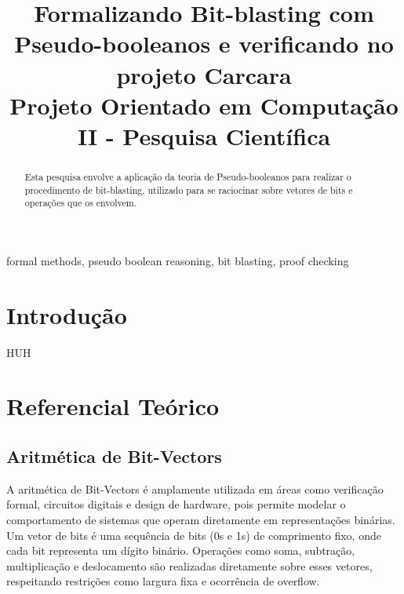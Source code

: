\documentclass[conference]{IEEEtran}
\begin{document}
\title{Formalizando Bit-blasting com Pseudo-booleanos e verificando no projeto Carcara\\
{\footnotesize Projeto Orientado em Computação II - Pesquisa Científica}
}

\author{
}

\maketitle

\begin{abstract}
    Esta pesquisa envolve a aplicação da teoria de Pseudo-booleanos para realizar o procedimento de
    bit-blasting, utilizado para se raciocinar sobre vetores de bits e operações que os envolvem.
\end{abstract}

\begin{IEEEkeywords}
    formal methods, pseudo boolean reasoning, bit blasting, proof checking
\end{IEEEkeywords}

\section{Introdução}

HUH

\section{Referencial Teórico}

\subsection{Aritmética de Bit-Vectors}
A aritmética de Bit-Vectors é amplamente utilizada em áreas como verificação formal,
circuitos digitais e design de hardware, pois permite modelar o comportamento de sistemas
que operam diretamente em representações binárias. Um vetor de bits é uma sequência de bits
(0s e 1s) de comprimento fixo, onde cada bit representa um dígito binário. Operações como soma,
subtração, multiplicação e deslocamento são realizadas diretamente sobre esses vetores,
respeitando restrições como largura fixa e ocorrência de overflow.
\end{document}
